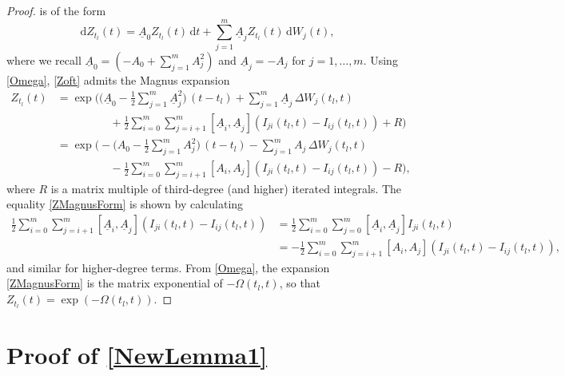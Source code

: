 \documentclass[onefignum]{siamart250211}
\begin{document}
\begin{proof}
 is of the form
\begin{equation}\mathrm{d}Z_{t_l}(t)=\underline{A}_0Z_{t_l}(t)\,\mathrm{d}t+\sum_{j=1}^m\underline{A}_jZ_{t_l}(t)\,\mathrm{d}W_j(t),\label{Zoft}\end{equation}
where we recall $\underline{A}_0=\left(-A_0+\sum_{j=1}^mA_j^2\right)$ and $\underline{A}_j=-A_j$ for $j=1,\ldots,m$. Using \cref{Omega}, \cref{Zoft} admits the Magnus expansion
\begin{align}
Z_{t_l}(t)&=\exp\bigg(\bigg(\underline{A}_0-\frac{1}{2}\sum_{j=1}^m\underline{A}_j^2\bigg)\,(t-t_l)+\sum_{j=1}^m\underline{A}_j\,\Delta W_j(t_l,t)\label{ZMagnusForm}\\
&\hspace{2cm}+\frac{1}{2}\sum_{i=0}^m\sum_{j=i+1}^m[\underline{A}_i,\underline{A}_j](I_{ji}(t_l,t)-I_{ij}(t_l,t))+R\bigg)\nonumber\\
&=\exp\bigg(-\bigg(A_0-\frac{1}{2}\sum_{j=1}^mA_j^2\bigg)\,(t-t_l)-\sum_{j=1}^mA_j\,\Delta W_j(t_l,t)\nonumber\\
&\hspace{2cm}-\frac{1}{2}\sum_{i=0}^m\sum_{j=i+1}^m[A_i,A_j](I_{ji}(t_l,t)-I_{ij}(t_l,t))-R\bigg),\nonumber
\end{align}
where $R$ is a matrix multiple of third-degree (and higher) iterated integrals. The equality \cref{ZMagnusForm} is shown by calculating
\begin{align*}
\frac{1}{2}\sum_{i=0}^m\sum_{j=i+1}^m[\underline{A}_i,\underline{A}_j](I_{ji}(t_l,t)-I_{ij}(t_l,t))&=\frac{1}{2}\sum_{i=0}^m\sum_{j=0}^m[\underline{A}_i,\underline{A}_j]I_{ji}(t_l,t)\\
&=-\frac{1}{2}\sum_{i=0}^m\sum_{j=i+1}^m[A_i,A_j](I_{ji}(t_l,t)-I_{ij}(t_l,t)),
\end{align*}
and similar for higher-degree terms. From \cref{Omega}, the expansion \cref{ZMagnusForm} is the matrix exponential of $-\Omega(t_l,t)$, so that $Z_{t_l}(t)=\exp(-\Omega(t_l,t))$.
\end{proof}


\section[Proof of inequalities lemma]{Proof of \cref{NewLemma1}}\label{ProofofNewLemma1}
\end{document}
